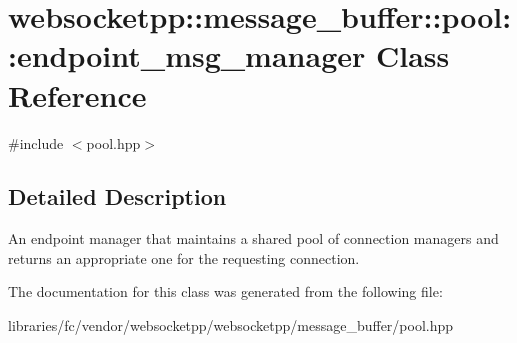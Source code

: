 \hypertarget{classwebsocketpp_1_1message__buffer_1_1pool_1_1endpoint__msg__manager}{}\section{websocketpp\+:\+:message\+\_\+buffer\+:\+:pool\+:\+:endpoint\+\_\+msg\+\_\+manager Class Reference}
\label{classwebsocketpp_1_1message__buffer_1_1pool_1_1endpoint__msg__manager}


{\ttfamily \#include $<$pool.\+hpp$>$}



\subsection{Detailed Description}
An endpoint manager that maintains a shared pool of connection managers and returns an appropriate one for the requesting connection. 

The documentation for this class was generated from the following file\+:\begin{DoxyCompactItemize}
\item 
libraries/fc/vendor/websocketpp/websocketpp/message\+\_\+buffer/pool.\+hpp\end{DoxyCompactItemize}
